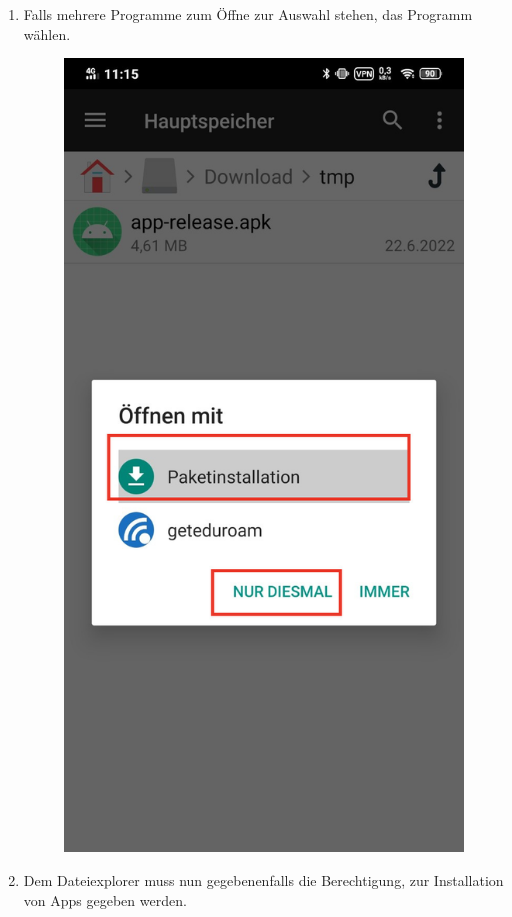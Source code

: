 \documentclass{article}
\begin{document}
\begin{enumerate}
\begin{figure}[H]
            \centering
        \end{figure}
    \item Falls mehrere Programme zum Öffne zur Auswahl stehen, das Programm  wählen.
        \begin{figure}[H]
            \includegraphics[scale=0.6]{15.jpg}
            \centering
        \end{figure}
    \item Dem Dateiexplorer muss nun gegebenenfalls die Berechtigung, zur Installation von Apps gegeben werden.


\end{enumerate}
\end{document}
